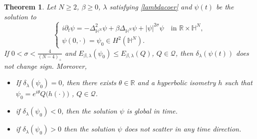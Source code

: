 \documentclass[10pt,leqno]{amsart}
\newtheorem{thm}{Theorem}[section]
\numberwithin{equation}{section}
\newcommand{\field}[1]{\mathbb{#1}}
\newcommand{\R}{\field{R}}          		%
\newcommand{\Hy}{\field{H}}
\begin{document}
\begin{thm}
\label{trapping}
Let $N\geq 2$, $\beta\geq 0$, $\lambda$ satisfying \eqref{lambdacoer} and $\psi (t)$ be the solution to 
$$\begin{cases}
i\partial_t\psi = -\Delta_{\Hy^N}^2\psi +\beta\Delta_{\Hy^N} \psi +|\psi|^{2\sigma}\psi \quad\text{in }\R\times \Hy^N,\\
\psi(0,\cdot)=\psi_0\in H^2 (\Hy^N).
\end{cases}$$
  If $0<\sigma<\frac{4}{(N-4)_+}$ and $E_{\beta ,\lambda} (\psi_0)\leq E_{\beta,\lambda} (Q)$, $Q\in \mathcal{Q}$, then $\delta_\lambda (\psi (t))$ does not change sign. Moreover,
\begin{itemize}
\item If $\delta_\lambda (\psi_0)=0$, then there exists $\theta \in \R$ and a hyperbolic isometry $h$ such that $\psi_0=e^{i\theta}Q\big(h(\cdot)\big)$ , $Q\in \mathcal{Q}$.
\item if $\delta_\lambda (\psi_0)<0$, then the solution $\psi$ is global in time.
\item if $\delta_\lambda (\psi_0)>0$ then the solution $\psi$ does not scatter in any time direction.
\end{itemize}
\end{thm}
\end{document}
